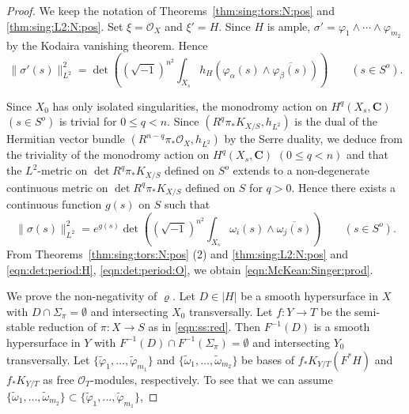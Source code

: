 \documentclass[amscd, leqno]{amsart}
\theoremstyle{plain}
\theoremstyle{definition}
\theoremstyle{remark}
\newenvironment{pf}{\begin{proof}}{\end{proof}}
\begin{document}
\begin{pf}
We keep the notation of Theorems~\ref{thm:sing:tors:N:pos} and \ref{thm:sing:L2:N:pos}. Set $\xi = {\mathcal O}_{X}$ and $\xi' = H$.
Since $H$ is ample, $\sigma' = \varphi_{1} \wedge\cdots\wedge \varphi_{m_{2}}$ by the Kodaira vanishing theorem. Hence
\begin{equation}
\label{eqn:det:period:H}
\| \sigma'(s) \|_{L^{2}}^{2} = \det\left( (\sqrt{-1})^{n^{2}} \int_{X_{s}} h_{H}(\varphi_{\alpha}(s) \wedge \overline{\varphi_{\beta}(s)} ) \right)
\qquad
(s \in S^{o}).
\end{equation}
\par
Since $X_{0}$ has only isolated singularities, the monodromy action on $H^{q}(X_{s}, {\mathbf C})$ $(s\in S^{o})$ is trivial for $0\leq q<n$. 
Since $(R^{q}\pi_{*}K_{X/S}, h_{L^{2}})$ is the dual of the Hermitian vector bundle $(R^{n-q}\pi_{*}{\mathcal O}_{X}, h_{L^{2}})$ 
by the Serre duality, we deduce from the triviality of the monodromy action on $H^{q}(X_{s}, {\mathbf C})$ $(0\leq q<n)$ 
and \cite[Th.\,4.4]{EFM21} that the $L^{2}$-metric on $\det R^{q}\pi_{*}K_{X/S}$ defined on $S^{o}$ extends to 
a non-degenerate continuous metric on $\det R^{q}\pi_{*}K_{X/S}$ defined on $S$ for $q>0$. 
Hence there exists a continuous function $g(s)$ on $S$ such that
\begin{equation}
\label{eqn:det:period:O}
\| \sigma(s) \|_{L^{2}}^{2} = e^{g(s)} \det\left( (\sqrt{-1})^{n^{2}} \int_{X_{s}} \omega_{i}(s) \wedge \overline{\omega_{j}(s)} \right)
\qquad
(s \in S^{o}).
\end{equation}
From Theorems~\ref{thm:sing:tors:N:pos} (2) and \ref{thm:sing:L2:N:pos} and \eqref{eqn:det:period:H}, \eqref{eqn:det:period:O}, 
we obtain \eqref{eqn:McKean:Singer:prod}.
\par
We prove the non-negativity of $\varrho$. Let $D \in |H|$ be a smooth hypersurface in $X$ with $D \cap \Sigma_{\pi}=\emptyset$ 
and intersecting $X_{0}$ transversally.
Let $f \colon Y \to T$ be the semi-stable reduction of $\pi \colon X \to S$ as in \eqref{eqn:ss:red}. 
Then $F^{-1}(D)$ is a smooth hypersurface in $Y$ with $F^{-1}(D)\cap F^{-1}(\Sigma_{\pi}) = \emptyset$ and
intersecting $Y_{0}$ transversally.
Let $\{ \widetilde{\varphi}_{1}, \ldots, \widetilde{\varphi}_{m_{1}} \}$ and $\{ \widetilde{\omega}_{1}, \ldots, \widetilde{\omega}_{m_{2}} \}$
be bases of $f_{*}K_{Y/T}(F^{*}H)$ and $f_{*}K_{Y/T}$ as free ${\mathcal O}_{T}$-modules, respectively.
To see that we can assume 
$\{ \widetilde{\omega}_{1}, \ldots, \widetilde{\omega}_{m_{2}} \} \subset \{ \widetilde{\varphi}_{1}, \ldots, \widetilde{\varphi}_{m_{1}} \}$, 

\end{pf}
\end{document}
